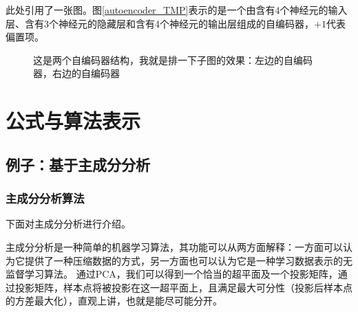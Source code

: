 \documentclass[a4paper,AutoFakeBold,oneside,12pt]{book}
\begin{document}
此处引用了一张图。图\ref{autoencoder_TMP}表示的是一个由含有4个神经元的输入层、含有3个神经元的隐藏层和含有4个神经元的输出层组成的自编码器，$+1$代表偏置项。


\begin{figure}[!htbp]
    \centering
    \quad %
    \caption{这是两个自编码器结构，我就是排一下子图的效果：\protect{}左边的自编码器，\protect{}右边的自编码器} %
    \label{Fig:RecAccuracy} %
\end{figure}

\section{公式与算法表示}

\subsection{例子：基于主成分分析}

\subsubsection{主成分分析算法}

下面对主成分分析进行介绍。

主成分分析是一种简单的机器学习算法，其功能可以从两方面解释：一方面可以认为它提供了一种压缩数据的方式，另一方面也可以认为它是一种学习数据表示的无监督学习算法。\cite{Goodfellow2016DeepLearning}
通过PCA，我们可以得到一个恰当的超平面及一个投影矩阵，通过投影矩阵，样本点将被投影在这一超平面上，且满足最大可分性（投影后样本点的方差最大化），直观上讲，也就是能尽可能分开。
\end{document}
